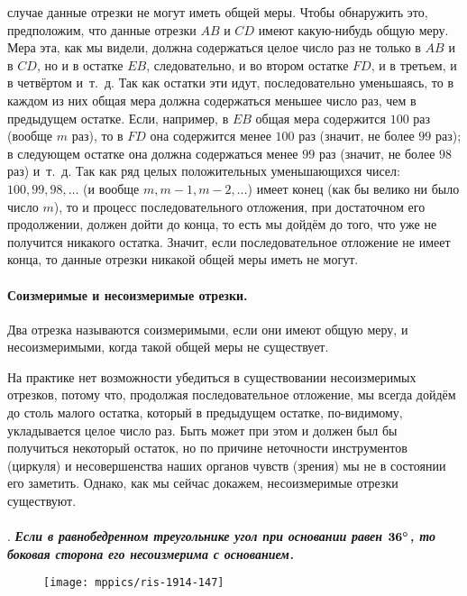 \smallskip
{} случае данные отрезки не могут иметь общей меры.
Чтобы обнаружить это, предположим, что данные отрезки $AB$ и $CD$ имеют какую-нибудь общую меру.
Мера эта, как мы видели, должна содержаться целое число раз не только в $AB$ и в $CD$, но и в остатке $EB$, следовательно, и во втором остатке $FD$, и в третьем, и в четвёртом и~т.~д.
Так как остатки эти идут, последовательно уменьшаясь, то в каждом из них общая мера должна содержаться меньшее число раз, чем в предыдущем остатке.
Если, например, в $EB$ общая мера содержится $100$ раз (вообще $m$ раз), то в $FD$ она содержится менее $100$ раз (значит, не более $99$ раз);
в следующем остатке она должна содержаться менее $99$ раз (значит, не более $98$ раз) и~т.~д.
Так как ряд целых положительных уменьшающихся чисел:
$100, 99, 98, \dots$
(и вообще $m, m-1, m-2,\dots$) имеет конец (как бы велико ни было число $m$), то и процесс последовательного отложения, при достаточном его продолжении, должен дойти до конца, то есть мы дойдём до того, что уже не получится никакого остатка.
Значит, если последовательное отложение не имеет конца, то данные отрезки никакой общей меры иметь не могут.

\paragraph{Соизмеримые и несоизмеримые отрезки.}\label{1938/148}
Два отрезка называются соизмеримыми, если они имеют общую меру, и несоизмеримыми, когда такой общей меры не существует.

На практике нет возможности убедиться в существовании несоизмеримых отрезков, потому что, продолжая последовательное отложение, мы всегда дойдём до столь малого остатка, который в предыдущем остатке, по-видимому, укладывается целое число раз.
Быть может при этом и должен был бы получиться некоторый остаток, но по причине неточности инструментов (циркуля) и несовершенства наших органов чувств (зрения) мы не в состоянии его заметить.
Однако, как мы сейчас докажем, несоизмеримые отрезки существуют.


\paragraph{}\label{1914/156}
.
\textbf{\emph{Если в равнобедренном треугольнике угол при основании равен $\bm{36\degree}$, то боковая сторона его несоизмерима с основанием.}}

\begin{wrapfigure}{o}{48mm}
\centering
\texttt{[image: mppics/ris-1914-147]}
\caption{}\label{1914/ris-147}
\end{wrapfigure}


